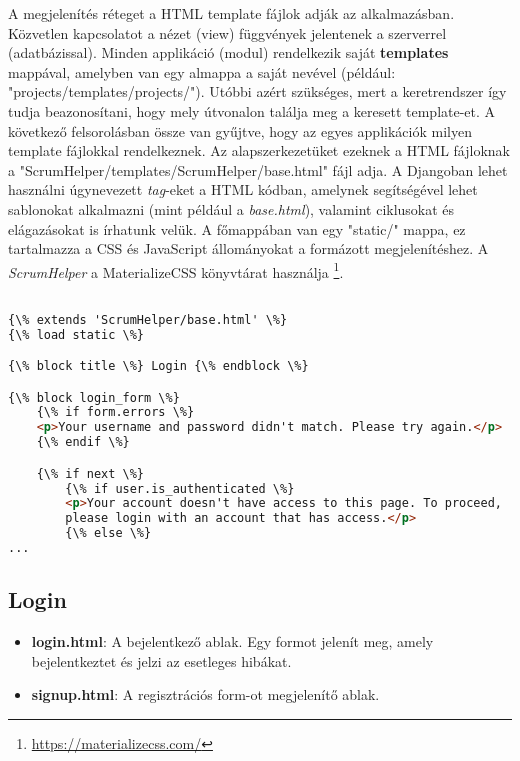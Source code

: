 A megjelenítés réteget a HTML template fájlok adják az alkalmazásban. Közvetlen kapcsolatot a nézet (view) függvények jelentenek a szerverrel (adatbázissal). Minden applikáció (modul) rendelkezik saját \textbf{templates} mappával, amelyben van egy almappa a saját nevével (például: "projects/templates/projects/"). Utóbbi azért szükséges, mert a keretrendszer így tudja beazonosítani, hogy mely útvonalon találja meg a keresett template-et. A következő felsorolásban össze van gyűjtve, hogy az egyes applikációk milyen template fájlokkal rendelkeznek. Az alapszerkezetüket ezeknek a HTML fájloknak a "ScrumHelper/templates/ScrumHelper/base.html" fájl adja. A Djangoban lehet használni úgynevezett \textit{tag}-eket a HTML kódban, amelynek segítségével lehet sablonokat alkalmazni (mint például a \textit{base.html}), valamint ciklusokat és elágazásokat is írhatunk velük. A főmappában van egy "static/" mappa, ez tartalmazza a CSS és JavaScript állományokat a formázott megjelenítéshez. A \textit{ScrumHelper} a MaterializeCSS könyvtárat használja \footnote{\url{https://materializecss.com/}}.

\pagebreak

\begin{lstlisting}[language={html}]

{\% extends 'ScrumHelper/base.html' \%}
{\% load static \%}

{\% block title \%} Login {\% endblock \%}

{\% block login_form \%}
    {\% if form.errors \%}
    <p>Your username and password didn't match. Please try again.</p>
    {\% endif \%}

    {\% if next \%}
        {\% if user.is_authenticated \%}
        <p>Your account doesn't have access to this page. To proceed,
        please login with an account that has access.</p>
        {\% else \%}
...
\end{lstlisting}


\subsection{Login}
\begin{itemize}
	\item \textbf{login.html}: A bejelentkező ablak. Egy formot jelenít meg, amely bejelentkeztet és jelzi az esetleges hibákat.
	\item \textbf{signup.html}: A regisztrációs form-ot megjelenítő ablak.
\end{itemize}
